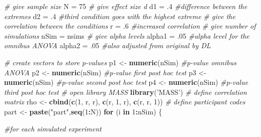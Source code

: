 \documentclass[]{book}
\newenvironment{Shaded}{\begin{snugshade}}{\end{snugshade}}
\newcommand{\CommentTok}[1]{\textcolor[rgb]{0.56,0.35,0.01}{\textit{#1}}}
\newcommand{\ControlFlowTok}[1]{\textcolor[rgb]{0.13,0.29,0.53}{\textbf{#1}}}
\newcommand{\DecValTok}[1]{\textcolor[rgb]{0.00,0.00,0.81}{#1}}
\newcommand{\FloatTok}[1]{\textcolor[rgb]{0.00,0.00,0.81}{#1}}
\newcommand{\KeywordTok}[1]{\textcolor[rgb]{0.13,0.29,0.53}{\textbf{#1}}}
\newcommand{\NormalTok}[1]{#1}
\newcommand{\OperatorTok}[1]{\textcolor[rgb]{0.81,0.36,0.00}{\textbf{#1}}}
\newcommand{\StringTok}[1]{\textcolor[rgb]{0.31,0.60,0.02}{#1}}
\begin{document}
\begin{Shaded}
\begin{Highlighting}[]
\CommentTok{# give sample size}
\NormalTok{N =}\StringTok{ }\DecValTok{75}
\CommentTok{# give effect size d}
\NormalTok{d1 =}\StringTok{ }\FloatTok{.4} \CommentTok{#difference between the extremes}
\NormalTok{d2 =}\StringTok{ }\FloatTok{.4} \CommentTok{#third condition goes with the highest extreme}
\CommentTok{# give the correlation between the conditions}
\NormalTok{r =}\StringTok{ }\FloatTok{.6} \CommentTok{#increased correlation}
\CommentTok{# give number of simulations}
\NormalTok{nSim =}\StringTok{ }\NormalTok{nsims}
\CommentTok{# give alpha levels}
\NormalTok{alpha1 =}\StringTok{ }\FloatTok{.05} \CommentTok{#alpha level for the omnibus ANOVA}
\NormalTok{alpha2 =}\StringTok{ }\FloatTok{.05} \CommentTok{#also adjusted from original by DL}

\CommentTok{# create vectors to store p-values}
\NormalTok{p1 <-}\StringTok{ }\KeywordTok{numeric}\NormalTok{(nSim) }\CommentTok{#p-value omnibus ANOVA}
\NormalTok{p2 <-}\StringTok{ }\KeywordTok{numeric}\NormalTok{(nSim) }\CommentTok{#p-value first post hoc test}
\NormalTok{p3 <-}\StringTok{ }\KeywordTok{numeric}\NormalTok{(nSim) }\CommentTok{#p-value second post hoc test}
\NormalTok{p4 <-}\StringTok{ }\KeywordTok{numeric}\NormalTok{(nSim) }\CommentTok{#p-value third post hoc test}
\CommentTok{# open library MASS}
\KeywordTok{library}\NormalTok{(}\StringTok{'MASS'}\NormalTok{)}
\CommentTok{# define correlation matrix}
\NormalTok{rho <-}\StringTok{ }\KeywordTok{cbind}\NormalTok{(}\KeywordTok{c}\NormalTok{(}\DecValTok{1}\NormalTok{, r, r), }\KeywordTok{c}\NormalTok{(r, }\DecValTok{1}\NormalTok{, r), }\KeywordTok{c}\NormalTok{(r, r, }\DecValTok{1}\NormalTok{))}
\CommentTok{# define participant codes}
\NormalTok{part <-}\StringTok{ }\KeywordTok{paste}\NormalTok{(}\StringTok{"part"}\NormalTok{,}\KeywordTok{seq}\NormalTok{(}\DecValTok{1}\OperatorTok{:}\NormalTok{N))}
\ControlFlowTok{for}\NormalTok{ (i }\ControlFlowTok{in} \DecValTok{1}\OperatorTok{:}\NormalTok{nSim) \{}
  
  \CommentTok{#for each simulated experiment}


\end{Highlighting}
\end{Shaded}
\end{document}
